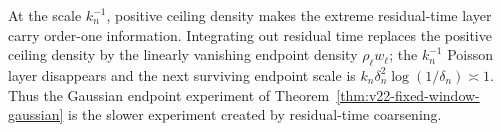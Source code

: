 \begin{remark}
\label{rem:v23-et-versus-endpoint}
At the scale \(k_n^{-1}\), positive ceiling density makes the extreme
residual-time layer carry order-one information.  Integrating out residual
time replaces the positive ceiling density by the linearly vanishing endpoint
density \(\rho_\ell w_\ell\); the \(k_n^{-1}\) Poisson layer disappears and
the next surviving endpoint scale is
\(k_n\delta_n^2\log(1/\delta_n)\asymp1\).  Thus the Gaussian endpoint experiment of
Theorem~\ref{thm:v22-fixed-window-gaussian} is the slower experiment
created by residual-time coarsening.
\end{remark}
